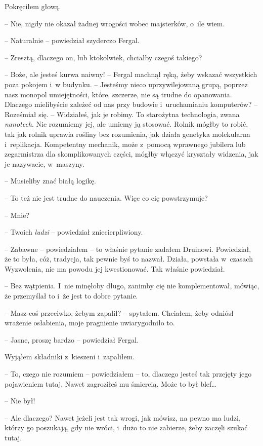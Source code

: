 \documentclass[oneside,polish,11pt,sfheadings]{mwbk}
\begin{document}
Pokręciłem głową. 

-- Nie, nigdy nie okazał żadnej wrogości wobec
majsterków, o~ile wiem.

-- Naturalnie -- powiedział szyderczo Fergal.

-- Zresztą, dlaczego on, lub ktokolwiek, chciałby czegoś takiego?

-- Boże, ale jesteś kurwa naiwny! -- Fergal machnął ręką, żeby wskazać
wszystkich poza pokojem i~w budynku. -- Jesteśmy nieco uprzywilejowaną
grupą, poprzez nasz monopol umiejętności, które, szczerze, nie są trudne
do opanowania. Dlaczego mielibyście zależeć od nas przy budowie i~uruchamianiu komputerów? -- Roześmiał się. -- Widziałeś, jak je robimy. To
starożytna technologia, zwana \textit{nanotech}. Nie rozumiemy jej, ale
umiemy ją stosować. Rolnik mógłby to robić, tak jak rolnik uprawia
rośliny bez rozumienia, jak działa genetyka molekularna i~replikacja.
Kompetentny mechanik, może z~pomocą wprawnego jubilera lub zegarmistrza
dla skomplikowanych części, mógłby włączyć kryształy widzenia, jak je
nazywacie, w~maszyny.

-- Musieliby znać białą logikę.

-- To też nie jest trudne do nauczenia. Więc co cię powstrzymuje?

-- Mnie?

-- Twoich \textit{ludzi} -- powiedział zniecierpliwiony.

-- Zabawne -- powiedziałem -- to właśnie pytanie zadałem Druinowi.
Powiedział, że to była, cóż, tradycja, tak pewnie byś to nazwał. Działa,
powstała w~czasach Wyzwolenia, nie ma powodu jej kwestionować. Tak
właśnie powiedział.

-- Bez wątpienia. I~nie minęłoby długo, zanimby cię nie komplementował,
mówiąc, że przemyślał to i~że jest to dobre pytanie.

-- Masz coś przeciwko, żebym zapalił? -- spytałem. Chciałem, żeby odniósł
wrażenie osłabienia, moje pragnienie uwiarygodniło to.

-- Jasne, proszę bardzo -- powiedział Fergal.

Wyjąłem składniki z~kieszeni i~zapaliłem.

-- To, czego nie rozumiem -- powiedziałem -- to, dlaczego jesteś tak
przejęty jego pojawieniem tutaj. Nawet zagroziłeś mu śmiercią. Może to
był blef\ldots

-- Nie był!

-- Ale dlaczego? Nawet jeżeli jest tak wrogi, jak mówisz, na pewno ma
ludzi, którzy go poszukają, gdy nie wróci, i~dużo to nie zabierze, żeby
zaczęli szukać tutaj.
\end{document}
